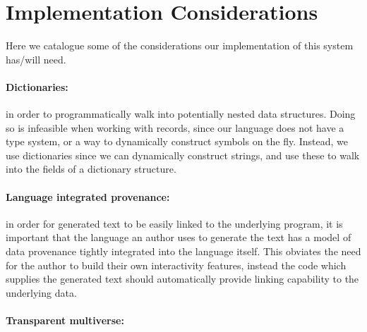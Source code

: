 \section{Implementation Considerations}
\label{sec:implementation}

Here we catalogue some of the considerations our implementation of this system has/will need.

\paragraph{Dictionaries:} in order to programmatically walk into potentially nested data structures.
Doing so is infeasible when working with records, since our language does not have a type system, 
or a way to dynamically construct symbols on the fly. Instead, we use dictionaries since we can
dynamically construct strings, and use these to walk into the fields of a dictionary structure.

\paragraph{Language integrated provenance:} in order for generated text to be easily linked to the
underlying program, it is important that the language an author uses to generate the text has a
model of data provenance tightly integrated into the language itself. This obviates the need for the
author to build their own interactivity features, instead the code which supplies the generated text
should automatically provide linking capability to the underlying data. 

\paragraph{Transparent multiverse:} 